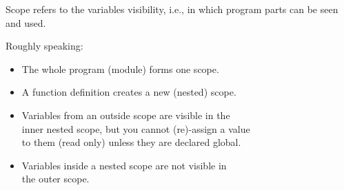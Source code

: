 \documentclass[aspectratio=1610,slidestop]{beamer}
\begin{document}
\begin{pframe}
 \addtocounter{framenumber}{-1}
 Scope refers to the variables visibility, i.e., in which program parts can be seen and used.
 \medskip

  Roughly speaking:
  \begin{itemize}
   \item The whole program (module) forms one scope.
   \item A function definition creates a new (nested) scope.
   \item Variables from an outside scope are visible in the \\
         inner nested scope, but you cannot (re)-assign a value\\
         to them (read only) unless they are declared global.
   \item Variables inside a nested scope are not visible in \\
         the outer scope.
 \end{itemize}
\end{pframe}


\begin{pframe}
 \begin{center}
  
 \end{center}
\end{pframe}

\begin{pframe}
 \addtocounter{framenumber}{-1}
 \begin{center}
  
 \end{center}
\end{pframe}

\begin{pframe}
 \addtocounter{framenumber}{-1}
 \begin{center}
  
 \end{center}
\end{pframe}

\begin{pframe}
 \addtocounter{framenumber}{-1}
 \begin{center}
  
 \end{center}
\end{pframe}
\end{document}
